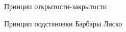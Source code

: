 \documentclass[10pt,pdf,hyperref={unicode}]{beamer}%
\begin{document}
\begin{frame}{Принцип открытости-закрытости}
\begin{figure}[h]
\end{figure}
\end{frame}

\begin{frame}{Принцип подстановки Барбары Лиско}
\begin{figure}[h]
\end{figure}
\end{frame}
\end{document}
